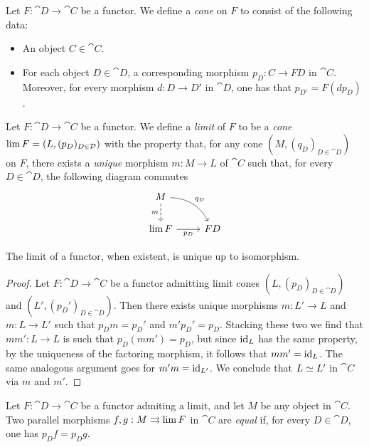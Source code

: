 \begin{definition}[Cone]
\label{def:cone-on-functor}
Let \(F: \cat D \to \cat C\) be a functor. We define a \emph{cone} on \(F\) to
consist of the following data:
\begin{itemize}\setlength\itemsep{0em}
\item An object \(C \in \cat C\).
\item For each object \(D \in \cat D\), a corresponding morphism \(p_D: C \to F
  D\) in \(\cat C\). Moreover, for every morphism \(d: D \to D'\) in \(\cat D\),
  one has that \(p_{D'} = F (d p_D)\).
\end{itemize}
\end{definition}

\begin{definition}
\label{def:limit-of-functor}
Let \(F: \cat D \to \cat C\) be a functor. We define a \emph{limit} of \(F\) to
be a \emph{cone} \(\operatorname{lim} F = (L, (p_{D})_{D \in \mathcal D})\) with the property
that, for any cone \((M, (q_D)_{D \in \cat D})\) on \(F\), there exists a
\emph{unique} morphism \(m: M \to L\) of \(\cat C\) such that, for every
\(D \in \cat D\), the following diagram commutes
\[
\begin{tikzcd}
M \ar[d, dashed, "m"'] \ar[rd, bend left, "q_D"] & \\
\Lim F \ar[r, "p_D"'] &F D
\end{tikzcd}
\]
\end{definition}

\begin{proposition}[Uniqueness]
\label{prop:limit-functor-uniqueness}
The limit of a functor, when existent, is unique up to isomorphism.
\end{proposition}

\begin{proof}
Let \(F: \cat D \to \cat C\) be a functor admitting limit cones
\((L, (p_D)_{D \in \cat D})\) and \((L', (p_D')_{D \in \cat D})\). Then there
exists unique morphisms \(m: L' \to L\) and \(m: L \to L'\) such that
\(p_D m = p_D'\) and \(m' p_D' = p_D\). Stacking these two we find that
\(m m': L \to L\) is such that \(p_D (m m') = p_D\), but since \(\operatorname{id}_L\) has the
same property, by the uniqueness of the factoring morphism, it follows that
\(m m' = \operatorname{id}_L\). The same analogous argument goes for \(m' m = \operatorname{id}_{L'}\). We
conclude that \(L \simeq L'\) in \(\cat C\) via \(m\) and \(m'\).
\end{proof}

\begin{proposition}
\label{prop:equal-parallel-factorizations}
Let \(F: \cat D \to \cat C\) be a functor admiting a limit, and let \(M\) be any
object in \(\cat C\). Two parallel morphisms \(f, g: M \rightrightarrows \operatorname{lim} F\) in
\(\cat C\) are \emph{equal} if, for every \(D \in \cat D\), one has
\(p_D f = p_D g\).
\end{proposition}


